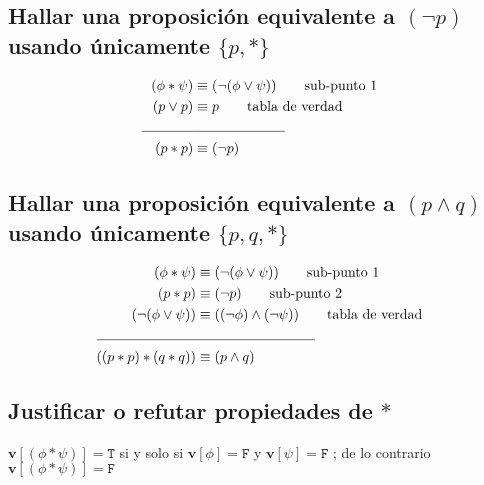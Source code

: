 \documentclass{article}
\begin{document}
\subsection{Hallar una proposición equivalente a $(\lnot p)$ usando únicamente $\{p, *\}$}
\begin{alignat*}{2}
    (\phi * \psi)  &\equiv (\lnot (\phi \vee \psi)) \tag*{sub-punto 1}\\
    (p \vee p) &\equiv p \tag*{tabla de verdad}\\
    \makebox[1.3cm]{\hrulefill}&\makebox[2.3cm]{\hrulefill}\\
    (p * p) &\equiv (\lnot p)
\end{alignat*}
\subsection{Hallar una proposición equivalente a $(p \wedge q)$ usando únicamente $\{p, q, *\}$}
\begin{alignat*}{2}
    (\phi * \psi)  &\equiv (\lnot (\phi \vee \psi)) \tag*{sub-punto 1}\\
    (p * p) &\equiv (\lnot p) \tag*{sub-punto 2}\\
    (\lnot (\phi \vee \psi)) &\equiv ((\lnot \phi) \wedge (\lnot \psi)) \tag*{tabla de verdad}\\
    \makebox[2.5cm]{\hrulefill}&\makebox[3cm]{\hrulefill}\\
    ((p * p) * (q * q)) &\equiv (p \wedge q)
\end{alignat*}
\subsection{Justificar o refutar propiedades  de $*$}

\begin{tcolorbox}[metateorema, title = Metateorema 2.23 para $*$]
    \vspace*{1cm}
    $\mathbf{v}[(\phi * \psi)] = \mathtt{T}$ si y solo si $\mathbf{v}[\phi] = \mathtt{F}$ y $\mathbf{v}[\psi] = \mathtt{F}$ ; de lo contrario $\mathbf{v}[(\phi * \psi)] = \mathtt{F}$
\end{tcolorbox}
\end{document}

